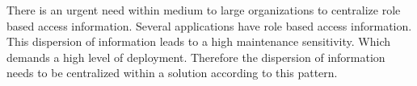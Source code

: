 
\begin{center}
   
\end{center}

There is an urgent need within medium to large organizations to centralize role based access information. Several applications have role based access information. This dispersion of information leads to a high maintenance sensitivity. Which demands a high level of deployment. Therefore the dispersion of information needs to be centralized within a solution according to this pattern.

